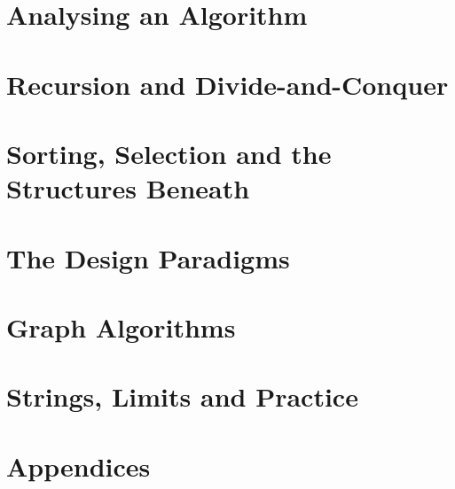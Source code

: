 \documentclass[11pt,a4paper,oneside]{report}
\begin{document}


\part{Analysing an Algorithm}






\part{Recursion and Divide-and-Conquer}







\part{Sorting, Selection and the Structures Beneath}






\part{The Design Paradigms}






\part{Graph Algorithms}





\part{Strings, Limits and Practice}





\appendix
\part*{Appendices}







\end{document}
